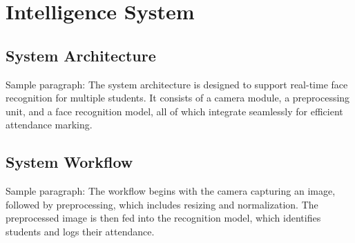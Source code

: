 \chapter{Intelligence System}
\section{System Architecture}
Sample paragraph: The system architecture is designed to support real-time face recognition for multiple students. It consists of a camera module, a preprocessing unit, and a face recognition model, all of which integrate seamlessly for efficient attendance marking.

\section{System Workflow}
Sample paragraph: The workflow begins with the camera capturing an image, followed by preprocessing, which includes resizing and normalization. The preprocessed image is then fed into the recognition model, which identifies students and logs their attendance.
